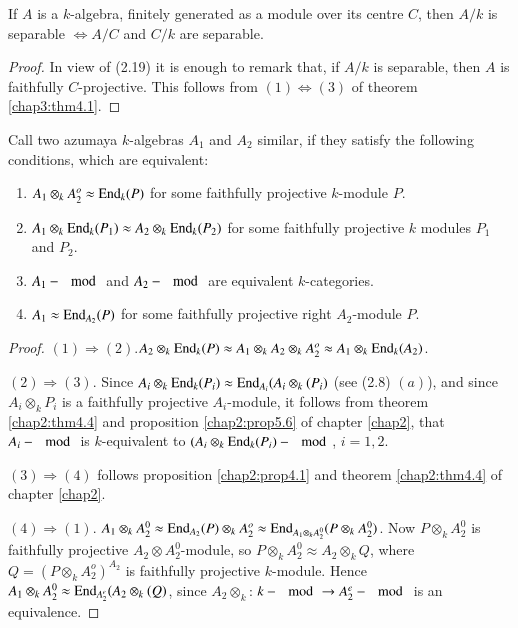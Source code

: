        \begin{coro} %
If $A$ is a $k$-algebra, finitely generated as a module over its
centre $C$, then $A/k$ is separable $\Leftrightarrow A/C$ and $C/k$
are separable. 
       \end{coro}       

       \begin{proof}%
In view of (2.19) it is enough to remark that, if $A/k$ is separable,
then $A$ is faithfully $C$-projective. This follows from $(1)
\Leftrightarrow (3)$ of theorem \ref{chap3:thm4.1}. 
       \end{proof}       

\setcounter{propanddef}{9}
\begin{propanddef} %
Call two azumaya $k$-algebras $A_1$ and $A_2$ similar, if they satisfy
the following conditions, which are equivalent: 
\begin{enumerate}[(1)]
\item $A_1 \otimes_k A^o_2 \approx \operatorname{End}_k (P)$ for some
  faithfully projective $k$-module $P$. 

\item $A_1 \otimes_k \operatorname{End}_k (P_1) \approx A_2 \otimes_k \operatorname{End}_k (P_2)$
for some faithfully projective $k$ modules $P_1$ and
    $P_2$. 

\item $A_1 - \mod$ and $A_2- \mod$ are equivalent
  $k$-categories. 

\item $A_1 \approx \operatorname{End}_{A_2} (P)$ for some faithfully
         projective right $A_2$-module $P$. 
         \end{enumerate}         
       \end{propanddef}

         \begin{proof}%
$(1) \Rightarrow (2)$.\pageoriginale $A_2 \otimes_k \operatorname{End}_k (P) \approx
           A_1 \otimes_k 
           A_2 \otimes_k A^o_2 \approx A_1 \otimes_k  \operatorname{End}_k (A_2)$. 

$(2) \Rightarrow (3)$. Since $A_i \otimes_k \operatorname{End}_k (P_i)
           \approx \operatorname{End}_{A_i}(A_i \otimes_k (P_i)$ (see (2.8) $(a)$),
         and since $A_i \otimes_k P_i$ is a faithfully projective
         $A_i$-module, it follows from theorem \ref{chap2:thm4.4} and
         proposition \ref{chap2:prop5.6} of chapter \ref{chap2}, that
         $A_i -  \mod$ is $k$-equivalent to $(A_i\otimes_k \operatorname{End}_k
         (P_i) - \mod$, $i=1, 2$.  

$(3) \Rightarrow (4)$ follows proposition \ref{chap2:prop4.1} and
         theorem \ref{chap2:thm4.4} of chapter \ref{chap2}. 
         
$(4) \Rightarrow (1)$. $A_1 \otimes_k A^0_2 \approx \operatorname{End}_{A_2}(P) 
\otimes_k A^o_2 \approx \operatorname{End}_{A_1 \otimes_k A^0_2} (P  \otimes_k
A^0_2)$. Now $P  \otimes_k A^0_2$ is faithfully projective $A_2
\otimes A^0_2$-module, so $P  \otimes_k A^0_2 \approx A_2 \otimes_k
Q$, where $Q =  (P  \otimes_k A^o_2)^{A_2}$ is faithfully projective
$k$-module. Hence $A_1 \otimes_k A^0_2 \approx \operatorname{End}_{A_2^e}(A_2
\otimes_k (Q)$, since $A_2 \otimes_k$: $k - \mod \to A^e_2 - \mod$ is
an equivalence.    
\end{proof}

